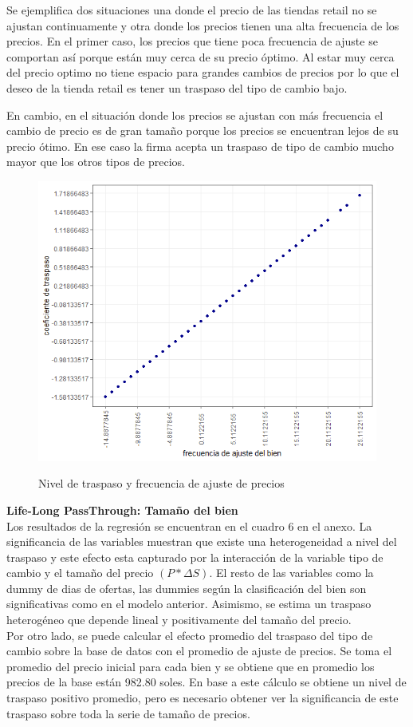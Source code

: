 \documentclass[12pt,a4paper,pdflatex]{article}
\begin{document}
Se ejemplifica dos situaciones una donde el precio de las tiendas retail no se ajustan continuamente y otra donde los precios tienen una alta frecuencia de los precios. En el primer caso, los precios que tiene poca frecuencia de ajuste se comportan así porque están muy cerca de su precio óptimo. Al estar muy cerca del precio optimo no tiene espacio para grandes cambios de precios por lo que el deseo de la tienda retail es tener un traspaso del tipo de cambio bajo.

En cambio, en el situación donde los precios se ajustan con más frecuencia el cambio de precio es de gran tamaño porque los precios se encuentran lejos de su precio ótimo. En ese caso la firma acepta un traspaso de tipo de cambio mucho mayor que los otros tipos de precios.
\clearpage
\begin{figure}[!h]
\centering
 \caption{Nivel de traspaso y frecuencia de ajuste de precios}
\includegraphics[scale=0.6]{E1.png}
  \label{fig:Nivel de traspaso y frecuencia de ajuste de precios}
\end{figure}

\textbf{Life-Long PassThrough: Tamaño del bien} \\
Los resultados de la regresión se encuentran en el cuadro 6 en el anexo. La significancia de las variables muestran que existe una heterogeneidad a nivel del traspaso y este efecto esta capturado por la interacción de la variable tipo de cambio y el tamaño del precio $(P* \Delta S)$. El resto de las variables como la dummy de dias de ofertas, las dummies según la clasificación del bien son significativas como en el modelo anterior. Asimismo, se estima un traspaso heterogéneo que depende lineal y positivamente del tamaño del precio. \\
Por otro lado, se puede calcular el efecto promedio del traspaso del tipo de cambio sobre la base de datos con el promedio de ajuste de precios. Se toma el promedio del precio inicial para cada bien y se obtiene que en promedio los precios de la base están 982.80 soles. En base a este cálculo se obtiene un nivel de traspaso positivo promedio, pero es necesario obtener ver la significancia de este traspaso sobre toda la serie de tamaño de precios.
\end{document}
